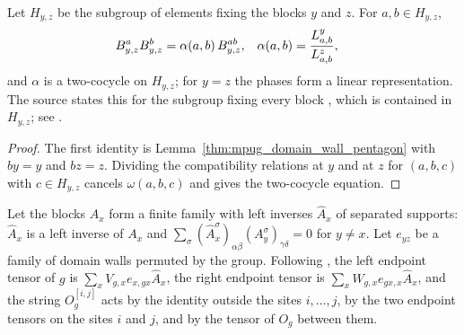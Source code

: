 \begin{lemma}
    \label{thm:mpug_domain_wall_projective}
    \leanok
    Let $H_{y,z}$ be the subgroup of elements fixing the blocks $y$ and $z$.
    For $a,b\in H_{y,z}$,
    \begin{align}
        B^a_{y,z}B^b_{y,z}
         & =\alpha(a,b)\,B^{ab}_{y,z},
         &
        \alpha(a,b)
         & =\frac{L^y_{a,b}}{L^z_{a,b}},
        \notag
    \end{align}
    and $\alpha$ is a two-cocycle on $H_{y,z}$; for $y=z$ the phases form a
    linear representation. The source states this for the subgroup fixing
    every block \cite[Section~IV.C]{GarreRubioSchuch2024DomainWall}, which is
    contained in $H_{y,z}$; see \cite{gap:gs24_unbroken_subgroup_stabilizer}.
\end{lemma}

\begin{proof}\leanok
    The first identity is Lemma~\ref{thm:mpug_domain_wall_pentagon} with
    $by=y$ and $bz=z$. Dividing the compatibility relations at $y$ and at $z$
    for $(a,b,c)$ with $c\in H_{y,z}$ cancels $\omega(a,b,c)$ and gives the
    two-cocycle equation.
\end{proof}

\begin{definition}
    \label{def:mpug_group_domain_wall_string}
    \leanok
    Let the blocks $A_x$ form a finite family with left inverses $\hat A_x$
    of separated supports: $\hat A_x$ is a left inverse of $A_x$ and
    $\sum_\sigma(\hat A_x^\sigma)_{\alpha\beta}(A_y^\sigma)_{\gamma\delta}=0$
    for $y\neq x$. Let $e_{yz}$ be a family of domain walls permuted by the
    group. Following \cite[Section~IV.B]{GarreRubioSchuch2024DomainWall},
    the left endpoint tensor of $g$ is
    $\sum_xV_{g,x}e_{x,gx}\hat A_x$, the right endpoint tensor is
    $\sum_xW_{g,x}e_{gx,x}\hat A_x$, and the string $O_g^{[i,j]}$ acts by the
    identity outside the sites $i,\dots,j$, by the two endpoint tensors on
    the sites $i$ and $j$, and by the tensor of $O_g$ between them.
\end{definition}

